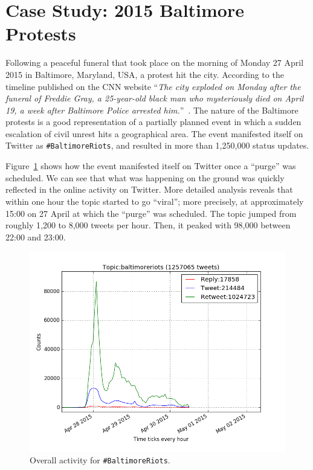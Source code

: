\section{Case Study: 2015 Baltimore Protests}\label{baltimorecasestudy}

Following a peaceful funeral that took place on the morning of Monday
27 April 2015 in Baltimore, Maryland, USA, a protest hit the
city. According to the timeline published on the CNN website
``{\emph{The city exploded on Monday after the funeral of Freddie
Gray, a 25-year-old black man who mysteriously died on April 19, a
week after Baltimore Police arrested
him.}}''~\cite{baltimorewiki:2015}. The nature of the Baltimore
protests is a good representation of a partially planned event in
which a sudden escalation of civil unrest hits a geographical area. The
event manifested itself on Twitter as {\texttt{\#BaltimoreRiots}}, and
resulted in more than 1,250,000 status updates.

Figure~\ref{fig:overallbaltimoreactivity} shows how the event
manifested itself on Twitter once a ``purge'' was scheduled. We can
see that what was happening on the ground was quickly reflected in the
online activity on Twitter. More detailed analysis reveals that within
one hour the topic started to go ``viral''; more precisely, at
approximately 15:00 on 27 April at which the ``purge'' was
scheduled. The topic jumped from roughly 1,200 to 8,000 tweets per
hour. Then, it peaked with 98,000 between 22:00 and 23:00.

\begin{figure}[htb]
\centering
\includegraphics[width=\columnwidth]{images/overallbaltimoreactivity.png}
\caption{Overall activity for {\texttt{\#BaltimoreRiots}}.}
\label{fig:overallbaltimoreactivity}
\end{figure}

